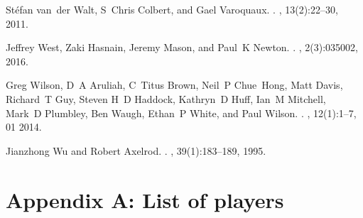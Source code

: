 \documentclass[10pt,letterpaper]{article}
\begin{document}
\begin{thebibliography}{10}
St{\'e}fan van~der Walt, S~Chris Colbert, and Gael Varoquaux.
.
, 13(2):22--30, 2011.

Jeffrey West, Zaki Hasnain, Jeremy Mason, and Paul~K Newton.
.
, 2(3):035002, 2016.

Greg Wilson, D~A Aruliah, C~Titus Brown, Neil~P Chue~Hong, Matt Davis,
  Richard~T Guy, Steven H~D Haddock, Kathryn~D Huff, Ian~M Mitchell, Mark~D
  Plumbley, Ben Waugh, Ethan~P White, and Paul Wilson.
.
, 12(1):1--7, 01 2014.

Jianzhong Wu and Robert Axelrod.
.
, 39(1):183--189, 1995.

\end{thebibliography}

\appendix

\section{Appendix A: List of players}\label{app:list_of_players}
\end{document}
